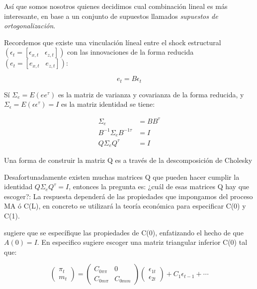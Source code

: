 \documentclass[
]{book}
\begin{document}
Así que somos nosotros quienes decidimos cual combinación lineal es más interesante, en base a un conjunto de supuestos llamados \emph{supuestos de ortogonalización}.

Recordemos que existe una vinculación líneal entre el shock estructural \((\epsilon_{t}=[\epsilon_{x,t}\;\;\;\epsilon_{z,t}])\) con las innovaciones de la forma reducida \((e_{t}=[e_{x,t}\;\;\;e_{z,t}])\):

\begin{equation}
e_{t}=B\epsilon_{t}
\end{equation}

Sí \(\Sigma_e=E(e e^{\tau})\) es la matriz de varianza y covarianza de la forma reducida, y \(\Sigma_\epsilon=E(\epsilon \epsilon^{\tau})=I\) es la matriz identidad se tiene:

\begin{align}
\Sigma_e&=BB^{\tau}\\
B^{-1}\Sigma_eB^{-1\tau}&=I\\
Q\Sigma_eQ^{\tau}&=I
\end{align}

Una forma de construir la matriz Q es a través de la descomposición de Cholesky

Desafortunadamente existen muchas matrices Q que pueden hacer cumplir la identidad \(Q\Sigma_eQ^{\tau}=I\), entonces la pregunta es: ¿cuál de esas matrices Q hay que escoger?: La respuesta dependerá de las propiedades que impongamos del proceso MA ó C(L), en concreto se utilizará la teoría económica para especificar C(0) y C(1).

\citet{Sims802} sugiere que se específique las propiedades de C(0), enfatizando el hecho de que \(A(0)=I\). En especifico sugiere escoger una matriz triangular inferior C(0) tal que:

\begin{equation}
    \left( \begin{array}{c}
    \pi_{t} \\
      m_{t} 
    \end{array}\right)=\left( \begin{array}{cc}
    C_{0\pi \pi} & 0\\
    C_{0m  \pi} & C_{0mm}
    \end{array}
    \right) \left( \begin{array}{c}
    \epsilon_{1t}\\
    \epsilon_{2t}
    \end{array}
    \right) +C_{1}\epsilon_{t-1}+\cdots
\end{equation}
\end{document}
